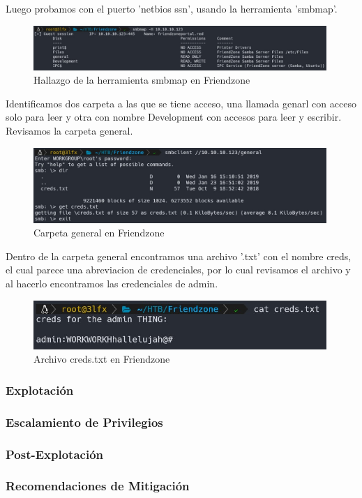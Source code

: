         \large{Luego probamos con el puerto 'netbios ssn', usando la herramienta 'smbmap'.}
        \par
        \begin{figure}[h!]
            \centering
            \includegraphics[width=0.99\textwidth]{informe4/imagenes/friendzone/03_smbmap.png}
            \caption{Hallazgo de la herramienta smbmap en Friendzone} 
        \end{figure}

        \large{Identificamos dos carpeta a las que se tiene acceso, una llamada genarl con acceso solo para leer y otra con nombre Development con accesos para leer y escribir. Revisamos la carpeta general.}
        \par
        \begin{figure}[h!]
            \centering
            \includegraphics[width=0.99\textwidth]{informe4/imagenes/friendzone/04_smb_creds.png}
            \caption{Carpeta general en Friendzone} 
        \end{figure}

        \large{Dentro de la carpeta general encontramos una archivo '.txt' con el nombre creds, el cual parece una abreviacion de credenciales, por lo cual revisamos el archivo y al hacerlo encontramos las credenciales de admin.}
        \par
        \begin{figure}[h!]
            \centering
            \includegraphics[width=0.99\textwidth]{informe4/imagenes/friendzone/05_cred_friendzone.png}
            \caption{Archivo creds.txt en Friendzone} 
        \end{figure}




    \subsubsection{Explotación}

    \subsubsection{Escalamiento de Privilegios}

    \subsubsection{Post-Explotación}

    \subsubsection{Recomendaciones de Mitigación}
